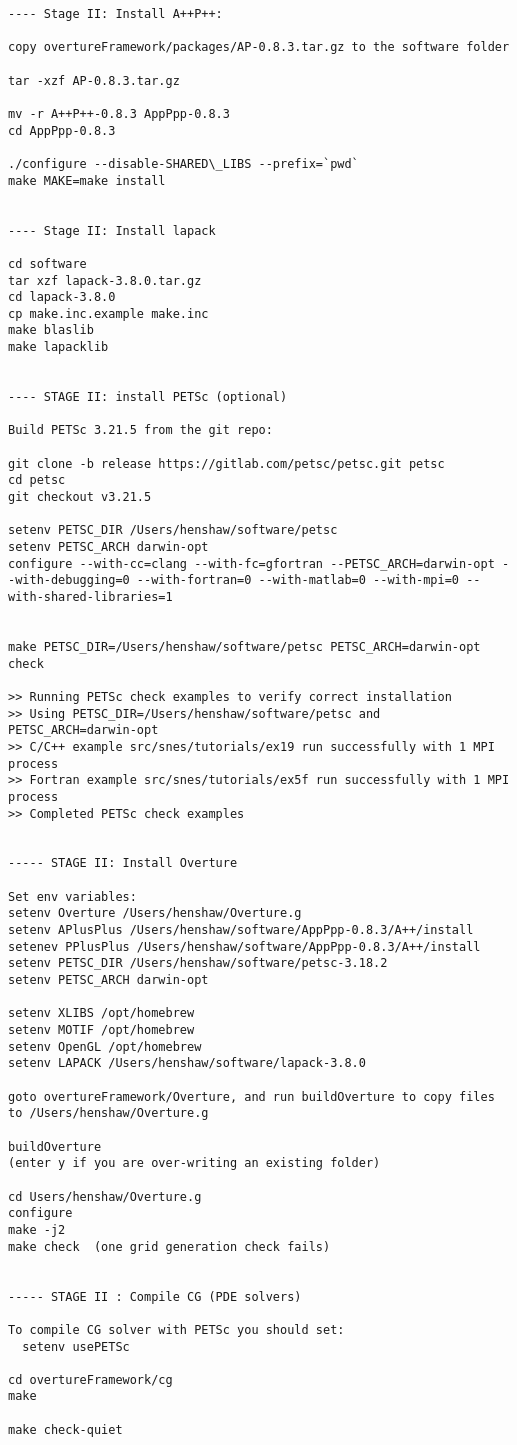 \begin{verbatim}
---- Stage II: Install A++P++:

copy overtureFramework/packages/AP-0.8.3.tar.gz to the software folder

tar -xzf AP-0.8.3.tar.gz

mv -r A++P++-0.8.3 AppPpp-0.8.3
cd AppPpp-0.8.3

./configure --disable-SHARED\_LIBS --prefix=`pwd`  
make MAKE=make install


---- Stage II: Install lapack

cd software
tar xzf lapack-3.8.0.tar.gz
cd lapack-3.8.0
cp make.inc.example make.inc
make blaslib
make lapacklib


---- STAGE II: install PETSc (optional)

Build PETSc 3.21.5 from the git repo: 

git clone -b release https://gitlab.com/petsc/petsc.git petsc
cd petsc
git checkout v3.21.5

setenv PETSC_DIR /Users/henshaw/software/petsc
setenv PETSC_ARCH darwin-opt
configure --with-cc=clang --with-fc=gfortran --PETSC_ARCH=darwin-opt --with-debugging=0 --with-fortran=0 --with-matlab=0 --with-mpi=0 --with-shared-libraries=1


make PETSC_DIR=/Users/henshaw/software/petsc PETSC_ARCH=darwin-opt check

>> Running PETSc check examples to verify correct installation
>> Using PETSC_DIR=/Users/henshaw/software/petsc and PETSC_ARCH=darwin-opt
>> C/C++ example src/snes/tutorials/ex19 run successfully with 1 MPI process
>> Fortran example src/snes/tutorials/ex5f run successfully with 1 MPI process
>> Completed PETSc check examples


----- STAGE II: Install Overture

Set env variables:
setenv Overture /Users/henshaw/Overture.g
setenv APlusPlus /Users/henshaw/software/AppPpp-0.8.3/A++/install
setenev PPlusPlus /Users/henshaw/software/AppPpp-0.8.3/A++/install
setenv PETSC_DIR /Users/henshaw/software/petsc-3.18.2
setenv PETSC_ARCH darwin-opt

setenv XLIBS /opt/homebrew
setenv MOTIF /opt/homebrew
setenv OpenGL /opt/homebrew
setenv LAPACK /Users/henshaw/software/lapack-3.8.0

goto overtureFramework/Overture, and run buildOverture to copy files to /Users/henshaw/Overture.g
  
buildOverture
(enter y if you are over-writing an existing folder)

cd Users/henshaw/Overture.g
configure 
make -j2
make check  (one grid generation check fails)


----- STAGE II : Compile CG (PDE solvers)

To compile CG solver with PETSc you should set: 
  setenv usePETSc  

cd overtureFramework/cg
make

make check-quiet




\end{verbatim}




